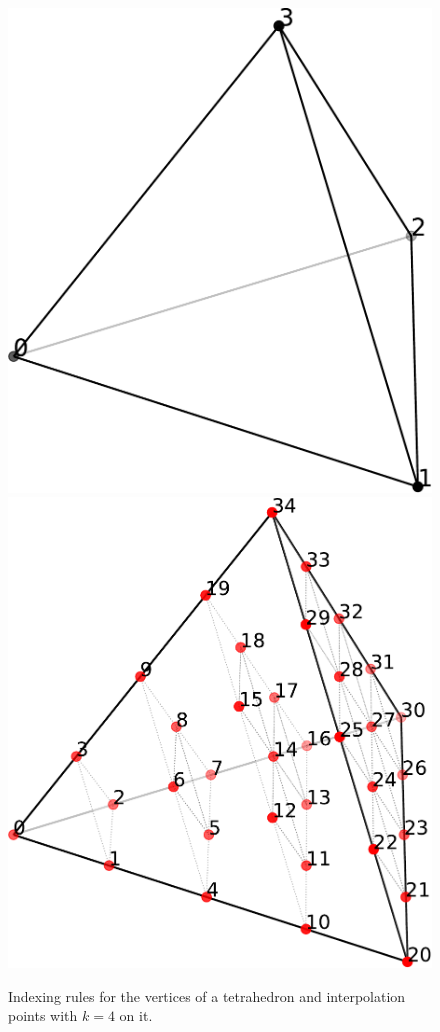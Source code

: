 \documentclass[12pt, a4paper]{article}
\begin{document}
\begin{figure}[htp]
    \centering
    \includegraphics[scale=0.24]{../figures/tet.pdf}\qquad \qquad
    \includegraphics[scale=0.25]{../figures/tetdof4.pdf}
    \caption{Indexing rules for the vertices of a tetrahedron and interpolation points with \(k=4\) on it.}
    \label{fig:tet}
\end{figure}
\end{document}
